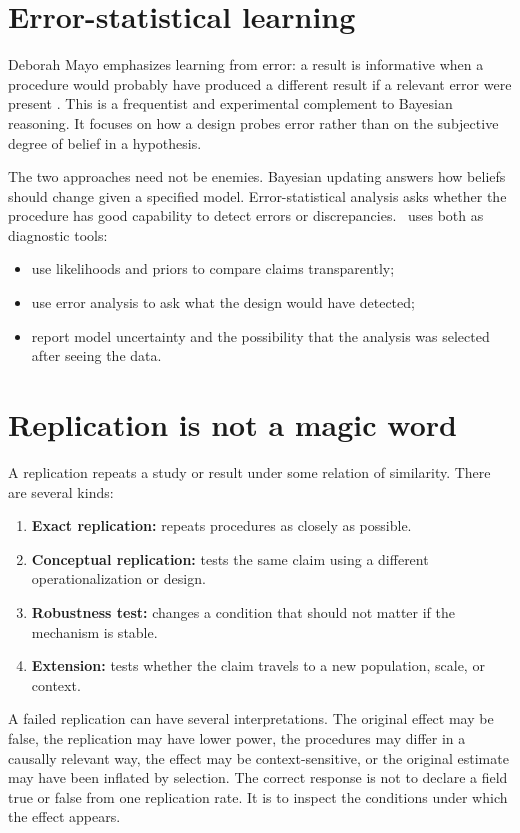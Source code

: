 \section{Error-statistical learning}

Deborah Mayo emphasizes learning from error: a result is informative when a
procedure would probably have produced a different result if a relevant error
were present \citep{mayo1996}. This is a frequentist and experimental
complement to Bayesian reasoning. It focuses on how a design probes error
rather than on the subjective degree of belief in a hypothesis.

The two approaches need not be enemies. Bayesian updating answers how beliefs
should change given a specified model. Error-statistical analysis asks whether
the procedure has good capability to detect errors or discrepancies. \RCR\
uses both as diagnostic tools:

\begin{itemize}
\item use likelihoods and priors to compare claims transparently;
\item use error analysis to ask what the design would have detected;
\item report model uncertainty and the possibility that the analysis was
selected after seeing the data.
\end{itemize}

\section{Replication is not a magic word}

A replication repeats a study or result under some relation of similarity.
There are several kinds:

\begin{enumerate}
\item \textbf{Exact replication:} repeats procedures as closely as possible.
\item \textbf{Conceptual replication:} tests the same claim using a different
operationalization or design.
\item \textbf{Robustness test:} changes a condition that should not matter if
the mechanism is stable.
\item \textbf{Extension:} tests whether the claim travels to a new population,
scale, or context.
\end{enumerate}

A failed replication can have several interpretations. The original effect may
be false, the replication may have lower power, the procedures may differ in a
causally relevant way, the effect may be context-sensitive, or the original
estimate may have been inflated by selection. The correct response is not to
declare a field true or false from one replication rate. It is to inspect the
conditions under which the effect appears.

